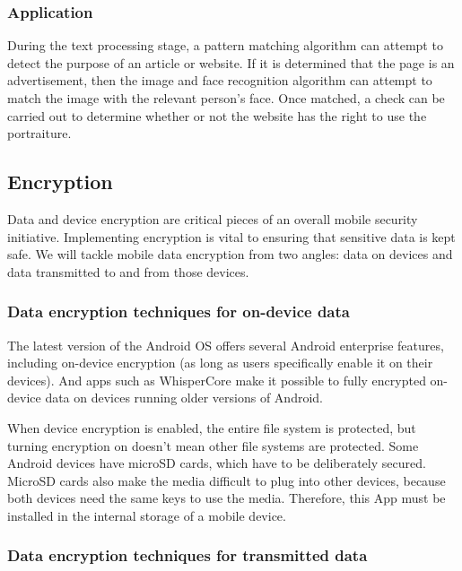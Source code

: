     \subsubsection{Application}

      During the text processing stage, a pattern matching algorithm can attempt to detect the purpose of an article or website. If it is determined that the page is an advertisement, then the image and face recognition algorithm can attempt to match the image with the relevant person's face. Once matched, a check can be carried out to determine whether or not the website has the right to use the portraiture.

\clearpage

\subsection{Encryption}

Data and device encryption are critical pieces of an overall mobile security initiative. Implementing encryption is vital to ensuring that sensitive data is kept safe. We will tackle mobile data encryption from two angles: data on devices and data transmitted to and from those devices.

\subsubsection{Data encryption techniques for on-device data}

The latest version of the Android OS offers several Android enterprise features, including on-device encryption (as long as users specifically enable it on their devices). And apps such as WhisperCore make it possible to fully encrypted on-device data on devices running older versions of Android.

When device encryption is enabled, the entire file system is protected, but turning encryption on doesn't mean other file systems are protected. Some Android devices have microSD cards, which have to be deliberately secured. MicroSD cards also make the media difficult to plug into other devices, because both devices need the same keys to use the media. Therefore, this App must be installed in the internal storage of a mobile device.

\subsubsection{ Data encryption techniques for transmitted data}

